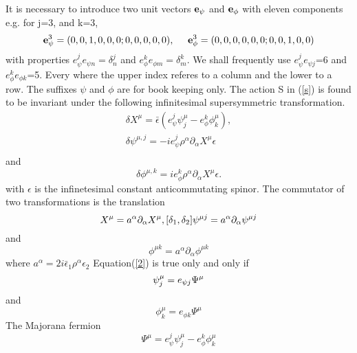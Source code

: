 \documentclass[a4paper,showpacs,preprintnumbers,amsmath,amssymb]{revtex4}
\begin{document}
It is necessary to introduce two unit vectors ${\bf{e}}_{\psi}$  and 
${ \bf{e}}_{\phi}$ with
eleven components e.g. for j=3, and k=3,
\begin{equation} 
{\bf{e}}_{\psi}^3=(0,0,1,0,0,0;0,0,0,0,0),\;\;\;\;\;  {\bf{e}}_{\phi}^3 =
(0,0,0,0,0,0;0,0,1,0,0)
\end{equation}
with properties ${e}^j_{\psi}{e}_{\psi {n}}=\delta^j_{n}$ and 
${e}^k_{\phi}{e}_{\phi m}=\delta^k_m$. We shall frequently use
 ${e}^j_{\psi}{e}_{\psi j}$=6 and
${e}^k_{\phi}{e}_{\phi k}$=5. Every where the upper index referes to a column and the lower
to a row. The suffixes $\psi$ and $\phi$ are for book keeping only.
The action S in (\ref{s}) is found to be invariant under the following 
infinitesimal supersymmetric transformation.
\begin{eqnarray}
\delta X^{\mu} =\bar{\epsilon}(e^j_{\psi}\psi^{\mu}_j - e^k_{\phi}\phi^{\mu}_k),
\nonumber\\
\delta\psi^{\mu,j}= - ie^j_{\psi}\rho^{\alpha}\partial_{\alpha}X^{\mu}\epsilon\nonumber\\
\end{eqnarray}
and
\begin{equation}
\delta\phi^{\mu,k}= ie^k_{\phi}\rho^{\alpha}\partial_{\alpha}X^{\mu}\epsilon.
\end{equation}
with $\epsilon$ is the infinetesimal constant anticommutating spinor. The commutator of
two transformations is the translation
\begin{equation}
[ \delta_1 ,\delta_2 ] X^{\mu} = a^{\alpha}\partial_{\alpha}X^{\mu},
[ \delta_1 ,\delta_2 ] \psi^{\mu j} = a^{\alpha}\partial_{\alpha}\psi^{\mu j}\nonumber\\
\end{equation}
and\\
\begin{equation}
 [ \delta_1 ,\delta_2 ] \phi^{\mu k} = a^{\alpha}\partial_{\alpha}\phi^{\mu k}\label{2}
\end{equation}
where $a^{\alpha}=2i\bar{\epsilon}_1\rho^{\alpha}\epsilon_2$
Equation(\ref{2}) is true only and only if
\begin{equation}
\psi_j^{\mu} = e_{\psi j}\Psi^{\mu}\nonumber\\
\end{equation}
and
\begin{equation}
\phi_k^{\mu} = e_{\phi k}\Psi^{\mu}
\end{equation}
The Majorana fermion
\begin{equation}
\Psi^{\mu} = e_{\psi}^j\psi^{\mu}_j - e_{\phi}^k\phi^{\mu}_k
\end{equation}
\end{document}
